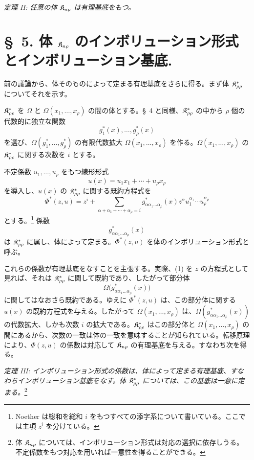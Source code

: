 \documentclass[11pt]{article}
\begin{document}
\emph{定理 II: 任意の体 $\mathfrak{K}_{n\rho}$ は有理基底をもつ。}

\section*{\S\ 5. 体 $\mathfrak{K}_{n\rho}$ のインボリューション形式とインボリューション基底.}

前の議論から、体そのものによって定まる有理基底をさらに得る。まず体 $\mathfrak{K}^*_{\rho\rho}$ についてそれを示す。

$\mathfrak{K}^*_{\rho\rho}$ を $\Omega$ と $\Omega(x_1,\ldots,x_\rho)$ の間の体とする。\S\ 4 と同様、$\mathfrak{K}^*_{\rho\rho}$ の中から $\rho$ 個の代数的に独立な関数
\[
  g_1^*(x),\ldots,g_\rho^*(x)
\]
を選び、$\Omega(g_1^*,\ldots,g_\rho^*)$ の有限代数拡大 $\Omega(x_1,\ldots,x_\rho)$ を作る。$\Omega(x_1,\ldots,x_\rho)$ の $\mathfrak{K}^*_{\rho\rho}$ に関する次数を $i$ とする。

不定係数 $u_1,\ldots,u_\rho$ をもつ線形形式
\[
  u(x)=u_1x_1+\cdots+u_\rho x_\rho
\]
を導入し、$u(x)$ の $\mathfrak{K}^*_{\rho\rho}$ に関する既約方程式を
\begin{equation}
 \Phi^*(z,u)=z^i+\sum_{\alpha+\alpha_1+\cdots+\alpha_\rho=i}
 g^*_{\alpha\alpha_1\ldots\alpha_\rho}(x)
 z^\alpha u_1^{\alpha_1}\cdots u_\rho^{\alpha_\rho}
\tag{1}
\end{equation}
とする。\footnote{Noether は総和を総和 $i$ をもつすべての添字系について書いている。ここでは主項 $z^i$ を分けている。} 係数
\[
  g^*_{\alpha\alpha_1\ldots\alpha_\rho}(x)
\]
は $\mathfrak{K}^*_{\rho\rho}$ に属し、体によって定まる。$\Phi^*(z,u)$ を体のインボリューション形式と呼ぶ。

これらの係数が有理基底をなすことを主張する。実際、(1) を $z$ の方程式として見れば、それは $\mathfrak{K}^*_{\rho\rho}$ に関して既約であり、したがって部分体
\[
  \Omega\bigl(g^*_{\alpha\alpha_1\ldots\alpha_\rho}(x)\bigr)
\]
に関してはなおさら既約である。ゆえに $\Phi^*(z,u)$ は、この部分体に関する $u(x)$ の既約方程式を与える。したがって $\Omega(x_1,\ldots,x_\rho)$ は、$\Omega(g^*_{\alpha\alpha_1\ldots\alpha_\rho}(x))$ の代数拡大、しかも次数 $i$ の拡大である。$\mathfrak{K}^*_{\rho\rho}$ はこの部分体と $\Omega(x_1,\ldots,x_\rho)$ の間にあるから、次数の一致は体の一致を意味することが知られている。転移原理により、$\Phi(z,u)$ の係数は対応して $\mathfrak{K}_{n\rho}$ の有理基底を与える。すなわち次を得る。

\emph{定理 III: インボリューション形式の係数は、体によって定まる有理基底、すなわちインボリューション基底をなす。体 $\mathfrak{K}^*_{\rho\rho}$ については、この基底は一意に定まる。}\footnote{体 $\mathfrak{K}_{n\rho}$ については、インボリューション形式は対応の選択に依存しうる。不定係数をもつ対応を用いれば一意性を得ることができる。}
\end{document}
